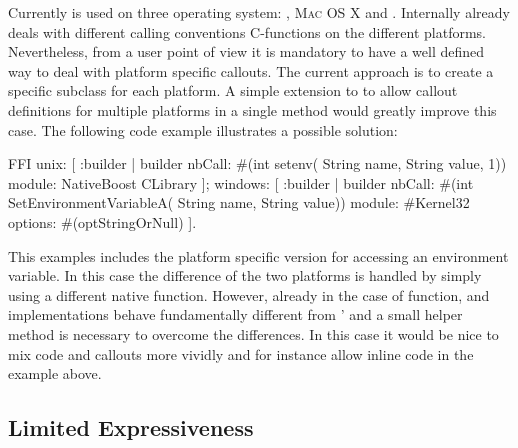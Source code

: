 Currently \NB is used on three operating system: \Linux, \textsc{Mac OS X} and \Windows.
Internally \NB already deals with different calling conventions C-functions on the different platforms.
Nevertheless, from a user point of view it is mandatory to have a well defined way to deal with platform specific \FFI callouts.
The current approach is to create a specific subclass for each platform.
A simple extension to \NB to allow callout definitions for multiple platforms in a single method would greatly improve this case.
The following code example illustrates a possible solution:
%
\begin{stcode}[]{}
FFI 
  unix: [ :builder |
    builder 
      nbCall: #(int setenv(
                      String name, String value, 1))
      module: NativeBoost CLibrary ];
  windows: [ :builder |
    builder
      nbCall: #(int SetEnvironmentVariableA(
                      String name, String value))
      module: #Kernel32
      options: #(optStringOrNull) ].
\end{stcode}
%
This examples includes the platform specific version for accessing an environment variable.
In this case the difference of the two platforms is handled by simply using a different native function.
However, already in the case of  function, \Windows and \unix implementations behave fundamentally different from \Windows'  and a small \PH helper method is necessary to overcome the differences.
In this case it would be nice to mix \PH code and \FFI callouts more vividly and for instance allow inline \PH code in the example above.

\subsection{Limited Expressiveness}

